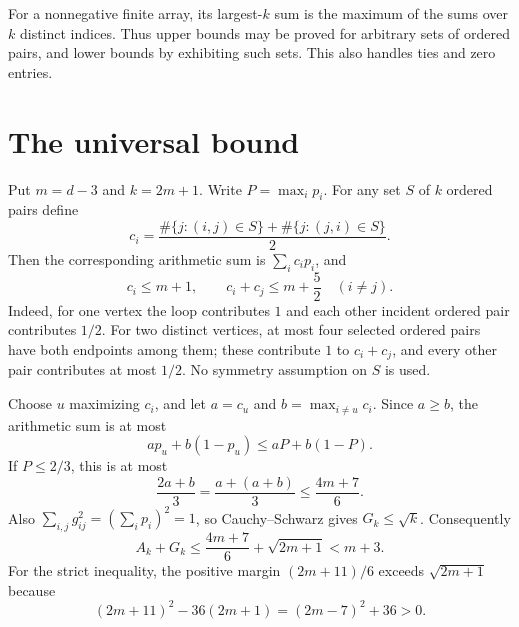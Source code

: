 \documentclass[11pt]{article}
\begin{document}
For a nonnegative finite array, its largest-$k$ sum is the maximum of
the sums over $k$ distinct indices. Thus upper bounds may be proved
for arbitrary sets of ordered pairs, and lower bounds by exhibiting
such sets. This also handles ties and zero entries.

\section{The universal bound}
Put $m=d-3$ and $k=2m+1$. Write $P=\max_i p_i$.
For any set $S$ of $k$ ordered pairs define
\[
 c_i=\frac{\#\{j:(i,j)\in S\}+\#\{j:(j,i)\in S\}}2.
\]
Then the corresponding arithmetic sum is $\sum_i c_i p_i$, and
\begin{equation}\label{inc}
 c_i\le m+1,\qquad c_i+c_j\le m+\frac52\quad(i\ne j).
\end{equation}
Indeed, for one vertex the loop contributes $1$ and each other
incident ordered pair contributes $1/2$. For two distinct vertices,
at most four selected ordered pairs have both endpoints among them;
these contribute $1$ to $c_i+c_j$, and every other pair contributes
at most $1/2$. No symmetry assumption on $S$ is used.

Choose $u$ maximizing $c_i$, and let $a=c_u$ and
$b=\max_{i\ne u}c_i$. Since $a\ge b$, the arithmetic sum is at most
\[
 a p_u+b(1-p_u)\le aP+b(1-P).
\]
If $P\le2/3$, this is at most
\begin{equation}\label{lowA}
 \frac{2a+b}{3}=\frac{a+(a+b)}3\le\frac{4m+7}{6}.
\end{equation}
Also $\sum_{i,j}g_{ij}^2=(\sum_i p_i)^2=1$, so
Cauchy--Schwarz gives $G_k\le\sqrt{k}$. Consequently
\[
 A_k+G_k\le\frac{4m+7}{6}+\sqrt{2m+1}<m+3.
\]
For the strict inequality, the positive margin
$(2m+11)/6$ exceeds $\sqrt{2m+1}$ because
\[
 (2m+11)^2-36(2m+1)=(2m-7)^2+36>0.
\]
\end{document}
